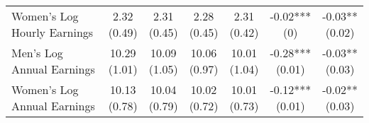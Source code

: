 \begin{landscape}
\begin{ThreePartTable}
\begin{longtable}[t]{>{\raggedright\arraybackslash}p{5cm}cccccc}
\addlinespace
\hspace{1em}Women’s Log Hourly Earnings & \specialcell{2.32\\(0.49)} & \specialcell{2.31\\(0.45)} & \specialcell{2.28\\(0.45)} & \specialcell{2.31\\(0.42)} & \specialcell{-0.02***\\(0)} & \specialcell{-0.03**\\(0.02)}\\
\hspace{1em}Men’s Log Annual Earnings & \specialcell{10.29\\(1.01)} & \specialcell{10.09\\(1.05)} & \specialcell{10.06\\(0.97)} & \specialcell{10.01\\(1.04)} & \specialcell{-0.28***\\(0.01)} & \specialcell{-0.03**\\(0.03)}\\
\hspace{1em}Women’s Log Annual Earnings & \specialcell{10.13\\(0.78)} & \specialcell{10.04\\(0.79)} & \specialcell{10.02\\(0.72)} & \specialcell{10.01\\(0.73)} & \specialcell{-0.12***\\(0.01)} & \specialcell{-0.02**\\(0.03)}\\*
\end{longtable}
\end{ThreePartTable}
\end{landscape}
